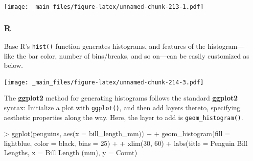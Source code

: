 \documentclass[
]{book}
\newenvironment{Shaded}{\begin{snugshade}}{\end{snugshade}}
\newcommand{\AttributeTok}[1]{\textcolor[rgb]{0.77,0.63,0.00}{#1}}
\newcommand{\DecValTok}[1]{\textcolor[rgb]{0.00,0.00,0.81}{#1}}
\newcommand{\FunctionTok}[1]{\textcolor[rgb]{0.00,0.00,0.00}{#1}}
\newcommand{\NormalTok}[1]{#1}
\newcommand{\SpecialCharTok}[1]{\textcolor[rgb]{0.00,0.00,0.00}{#1}}
\newcommand{\StringTok}[1]{\textcolor[rgb]{0.31,0.60,0.02}{#1}}
\begin{document}
\texttt{[image: \_main\_files/figure-latex/unnamed-chunk-213-1.pdf]}

\hypertarget{r-38}{%
\subsubsection*{R}\label{r-38}}

Base R's \texttt{hist()} function generates histograms, and features of the histogram---like the bar color, number of bins/breaks, and so on---can be easily customized as below.

\begin{Shaded}
\end{Shaded}

\texttt{[image: \_main\_files/figure-latex/unnamed-chunk-214-3.pdf]}

The \textbf{ggplot2} method for generating histograms follows the standard \textbf{ggplot2} syntax: Initialize a plot with \texttt{ggplot()}, and then add layers thereto, specifying aesthetic properties along the way. Here, the layer to add is \texttt{geom\_histogram()}.

\begin{Shaded}
\begin{Highlighting}[]
\SpecialCharTok{\textgreater{}} \FunctionTok{ggplot}\NormalTok{(penguins, }\FunctionTok{aes}\NormalTok{(}\AttributeTok{x =}\NormalTok{ bill\_length\_mm)) }\SpecialCharTok{+}
\SpecialCharTok{+}   \FunctionTok{geom\_histogram}\NormalTok{(}\AttributeTok{fill =} \StringTok{\textquotesingle{}lightblue\textquotesingle{}}\NormalTok{, }\AttributeTok{color =} \StringTok{\textquotesingle{}black\textquotesingle{}}\NormalTok{, }\AttributeTok{bins =} \DecValTok{25}\NormalTok{) }\SpecialCharTok{+}
\SpecialCharTok{+}   \FunctionTok{xlim}\NormalTok{(}\DecValTok{30}\NormalTok{, }\DecValTok{60}\NormalTok{) }\SpecialCharTok{+} \FunctionTok{labs}\NormalTok{(}\AttributeTok{title =} \StringTok{\textquotesingle{}Penguin Bill Lengths\textquotesingle{}}\NormalTok{, }\AttributeTok{x =} \StringTok{\textquotesingle{}Bill Length (mm)\textquotesingle{}}\NormalTok{, }\AttributeTok{y =} \StringTok{\textquotesingle{}Count\textquotesingle{}}\NormalTok{)}
\end{Highlighting}
\end{Shaded}
\end{document}
